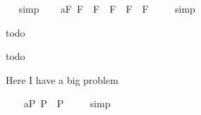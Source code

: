 \begin{isabellebody}
\isadelimproof
\ %
\endisadelimproof
%
\isatagproof
{}\isamarkupfalse%
\ simp\ \isamarkupfalse%
%
\endisatagproof
{\isafoldproof}%
%
\isadelimproof
%
\endisadelimproof
\isanewline
\ \isamarkupfalse%
\ a{}{}{\isacharunderscore}{}{\isacharunderscore}F{\isacharcolon}\ {\isachardoublequoteopen}{\isacharbrackleft}{\isacharparenleft}\isactrlbold {\isasymnot}{\isasymphi}\isactrlsup F\ \isactrlbold {\isasymrightarrow}\ \isactrlbold {\isasymnot}{\isasympsi}\isactrlsup F{\isacharparenright}\ \isactrlbold {\isasymrightarrow}\ {\isacharparenleft}{\isacharparenleft}\isactrlbold {\isasymnot}{\isasymphi}\isactrlsup F\ \isactrlbold {\isasymrightarrow}\ {\isasympsi}\isactrlsup F{\isacharparenright}\ \isactrlbold {\isasymrightarrow}\ {\isasymphi}\isactrlsup F{\isacharparenright}{\isacharbrackright}\ {\isacharequal}\ {\isasymtop}{\isachardoublequoteclose}%
\isadelimproof
\ %
\endisadelimproof
%
\isatagproof
{}\isamarkupfalse%
\ simp\ \isamarkupfalse%
%
\endisatagproof
{\isafoldproof}%
%
\isadelimproof
%
\endisadelimproof
%
\isamarkuptrue%
%
\begin{isamarkuptext}%
todo%
\end{isamarkuptext}%
\isamarkuptrue%
%
\isamarkuptrue%
%
\begin{isamarkuptext}%
todo%
\end{isamarkuptext}%
\isamarkuptrue%
%
\isamarkuptrue%
%
\begin{isamarkuptext}%
Here I have a big problem%
\end{isamarkuptext}%
\isamarkuptrue%
\ \ \isamarkupfalse%
\ a{}{}{\isacharunderscore}{}{\isacharunderscore}P{\isacharcolon}\ {\isachardoublequoteopen}{\isacharbrackleft}\isactrlbold {\isasymA}{\isasymphi}\isactrlsup P\ \isactrlbold {\isasymequiv}\ {\isasymphi}\isactrlsup P{\isacharbrackright}\ {\isacharequal}\ {\isasymtop}{\isachardoublequoteclose}%
\isadelimproof
\ %
\endisadelimproof
%
\isatagproof
{}\isamarkupfalse%
\ simp%
\endisatagproof
{\isafoldproof}%
%
\isadelimproof
%
\endisadelimproof
\ \isamarkupfalse%
%
\isadelimproof
\ %
\endisadelimproof
%
\isatagproof
{}\isamarkupfalse%
%
\endisatagproof
{\isafoldproof}%
%
\isadelimproof
%
\endisadelimproof
%
\isamarkuptrue%
\ \isamarkupfalse%

\end{isabellebody}
